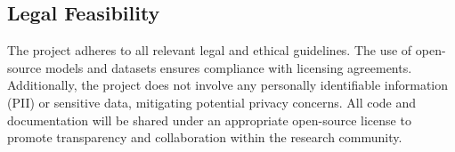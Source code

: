 \subsection{Legal Feasibility}
The project adheres to all relevant legal and ethical guidelines. The use of open-source models and datasets ensures compliance with licensing agreements. Additionally, the project does not involve any personally identifiable information (PII) or sensitive data, mitigating potential privacy concerns. All code and documentation will be shared under an appropriate open-source license to promote transparency and collaboration within the research community.